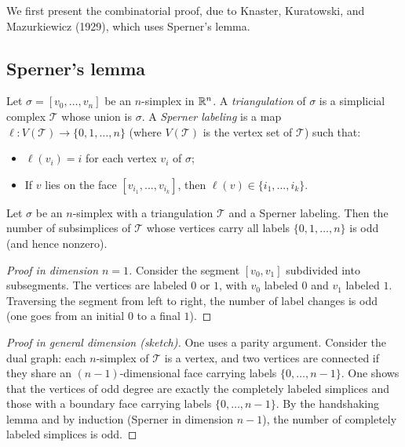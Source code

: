 We first present the combinatorial proof, due to Knaster, Kuratowski, and
Mazurkiewicz (1929), which uses Sperner's lemma.

\subsection{Sperner's lemma}

\begin{definition}
Let $\sigma = [v_0, \ldots, v_n]$ be an $n$-simplex in $\mathbb{R}^n$. A
\emph{triangulation} of $\sigma$ is a simplicial complex $\mathcal{T}$ whose
union is $\sigma$. A \emph{Sperner labeling} is a map
$\ell : V(\mathcal{T}) \to \{0, 1, \ldots, n\}$ (where $V(\mathcal{T})$ is
the vertex set of $\mathcal{T}$) such that:
\begin{itemize}
    \item $\ell(v_i) = i$ for each vertex $v_i$ of $\sigma$;
    \item If $v$ lies on the face $[v_{i_1}, \ldots, v_{i_k}]$, then
          $\ell(v) \in \{i_1, \ldots, i_k\}$.
\end{itemize}
\end{definition}

\begin{lemma}[Sperner, 1928]\label{lem:sperner}
Let $\sigma$ be an $n$-simplex with a triangulation $\mathcal{T}$ and a Sperner
labeling. Then the number of subsimplices of $\mathcal{T}$ whose vertices carry
all labels $\{0, 1, \ldots, n\}$ is odd (and hence nonzero).
\end{lemma}

\begin{proof}[Proof in dimension $n = 1$]
Consider the segment $[v_0, v_1]$ subdivided into subsegments. The vertices are
labeled $0$ or $1$, with $v_0$ labeled $0$ and $v_1$ labeled $1$. Traversing the
segment from left to right, the number of label changes is odd (one goes from an
initial $0$ to a final $1$).
\end{proof}

\begin{proof}[Proof in general dimension (sketch)]
One uses a parity argument. Consider the dual graph: each $n$-simplex of
$\mathcal{T}$ is a vertex, and two vertices are connected if they share an
$(n-1)$-dimensional face carrying labels $\{0, \ldots, n-1\}$. One shows that
the vertices of odd degree are exactly the completely labeled simplices and
those with a boundary face carrying labels $\{0, \ldots, n-1\}$. By the
handshaking lemma and by induction (Sperner in dimension $n-1$), the number of
completely labeled simplices is odd.
\end{proof}

